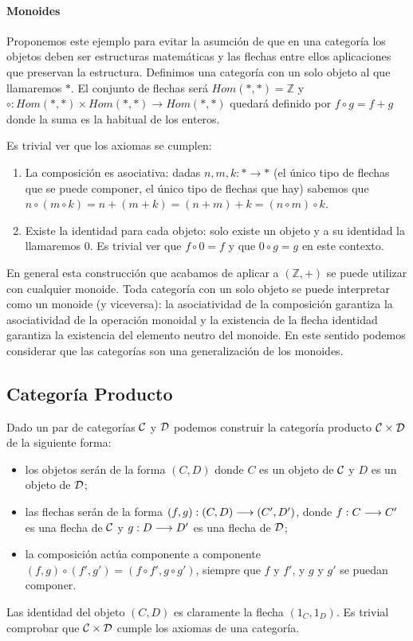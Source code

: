 \paragraph{Monoides}
Proponemos este ejemplo para evitar la asumción de que en una categoría
los objetos deben ser estructuras matemáticas y las flechas entre ellos
aplicaciones que preservan la estructura. Definimos una categoría
con un solo objeto al que llamaremos $*$. El conjunto de flechas
será $Hom(*, *) = \mathbb{Z}$ y
$\circ : Hom(*, *)\times Hom(*, *)\rightarrow Hom(*, *)$ quedará definido
por $f \circ g = f + g$ donde la suma es la habitual de los enteros.

Es trivial ver que los axiomas se cumplen:
\begin{enumerate}
\item La composición es asociativa: dadas $n, m, k : * \longrightarrow *$
(el único tipo de flechas que se puede componer, el único tipo de
flechas que hay) sabemos que
$n \circ (m \circ k) = n + (m + k) = (n + m) + k = (n \circ m) \circ k$.

\item Existe la identidad para cada objeto: solo existe un objeto y a su
identidad la llamaremos 0. Es trivial ver que $f \circ 0 = f$ y que
$0 \circ g = g$ en este contexto.
\end{enumerate}
En general esta construcción que acabamos de aplicar a $(\mathbb{Z}, +)$
se puede utilizar con cualquier monoide. Toda categoría con un solo
objeto se puede interpretar como un monoide (y viceversa):
la asociatividad de la
composición garantiza la asociatividad de la operación monoidal y
la existencia de la flecha identidad garantiza la existencia del
elemento neutro del monoide. En este sentido podemos considerar que
las categorías son una generalización de los monoides.

\subsection{Categoría Producto}
Dado un par de categorías $\mathcal{C}$ y $\mathcal{D}$ podemos construir la categoría
producto $\mathcal{C}\times\mathcal{D}$ de la siguiente forma:
\begin{itemize}
\item los objetos serán de la forma $(C, D)$ donde $C$ es un objeto
  de $\mathcal{C}$ y $D$ es un objeto de $\mathcal{D}$;
\item las flechas serán de la forma $(f, g) : (C, D)\longrightarrow (C', D')$,
  donde $f: C\longrightarrow C'$ es una flecha de $\mathcal{C}$ y $g : D\longrightarrow D'$
  es una flecha de $\mathcal{D}$;
\item la composición actúa componente a componente
  $(f, g) \circ (f', g') = (f \circ f', g \circ g')$, siempre
  que $f$ y $f'$, y $g$ y $g'$ se puedan componer.
\end{itemize}

Las identidad del objeto $(C, D)$ es claramente la flecha
$(1_C, 1_D)$. Es trivial comprobar que $\mathcal{C}\times\mathcal{D}$ cumple
los axiomas de una categoría.
